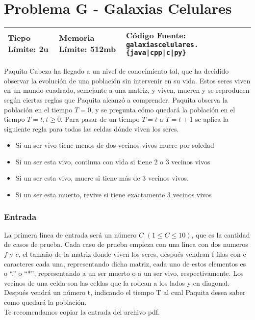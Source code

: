 \chapter*{Problema G - Galaxias Celulares}

\begin{center}
  \begin{tabular}{ | l | l | l | }
    \hline
    Tiepo Límite: 2u & Memoria Límite: 512mb & Código Fuente: \texttt{galaxiascelulares.\{java|cpp|c|py\}} \\
    \hline
  \end{tabular}
\end{center}

Paquita Cabeza ha llegado a un nivel de conocimiento tal, que ha decidido observar la evolución de una población sin intervenir en su vida. Estos seres viven en un mundo cuadrado, semejante a una matriz, y viven, mueren y se reproducen según ciertas reglas que Paquita alcanzó a comprender. Paquita observa la población en el tiempo $T=0$, y se pregunta cómo quedará la población en el tiempo $T=t, t\geq 0$. Para pasar de un tiempo $T=t$ a $T= t+1$ se aplica la siguiente regla para todas las celdas dónde viven los seres.
\begin{itemize}
    \item Si un ser vivo tiene menos de dos vecinos vivos muere por soledad
    \item Si un ser esta vivo, continua con vida si tiene 2 o 3 vecinos vivos
    \item Si un ser esta vivo, muere si tiene más de 3 vecinos vivos.
    \item Si un ser esta muerto, revive si tiene exactamente 3 vecinos vivos
\end{itemize}

\subsection*{Entrada}

La primera línea de entrada será un número $C$ $(1 \leq  C\leq 10)$, que es la cantidad de casos de prueba. Cada caso de prueba empieza con una linea con dos numeros $f$ y $c$, el tamaño de la matriz donde viven los seres, después vendran f filas con c caracteres cada una, representando dicha matriz, cada uno de estos elementos es o ``.'' o ``*'', representando a un ser muerto o a un ser vivo, respectivamente. Los vecinos de una celda son las celdas que la rodean a los lados y en diagonal. \\
Después vendrá un número t, indicando el tiempo T al cual Paquita desea saber como quedará la población. \\
Te recomendamos copiar la entrada del archivo pdf.
